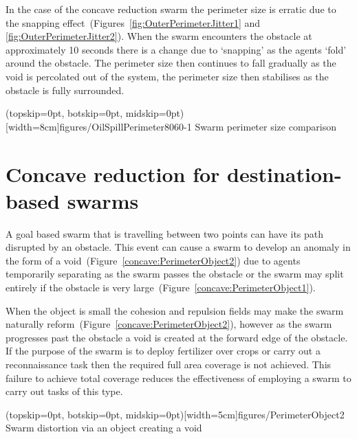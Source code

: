 \documentclass{ieeeaccess}
\begin{document}
In the case of the concave reduction swarm the perimeter size is erratic due to the snapping effect~(Figures~\ref{fig:OuterPerimeterJitter1} and \ref{fig:OuterPerimeterJitter2}). When the swarm encounters the obstacle at approximately 10 seconds there is a change due to `snapping' as the agents `fold' around the obstacle. The perimeter size then continues to fall gradually as the void is percolated out of the system, the perimeter size then stabilises as the obstacle is fully surrounded.

\Figure[t!](topskip=0pt, botskip=0pt, midskip=0pt)[width=8cm]{figures/OilSpillPerimeter8060-1}
{Swarm perimeter size comparison\label{concave:OilSpillPerimeter8060-1}}


\section{Concave reduction for destination-based swarms}\label{concave:mobileSwarm1}
A goal based swarm that is travelling between two points can have its path disrupted by an obstacle. This event can cause a swarm to develop an anomaly in the form of a void~(Figure~\ref{concave:PerimeterObject2}) due to agents temporarily separating as the swarm passes the obstacle or the swarm may split entirely if the obstacle is very large~(Figure~\ref{concave:PerimeterObject1}). 

When the object is small the cohesion and repulsion fields may make the swarm naturally reform~(Figure~\ref{concave:PerimeterObject2}), however as the swarm progresses past the obstacle a void is created at the forward edge of the obstacle. If the purpose of the swarm is to deploy fertilizer over crops or carry out a reconnaissance task then the required full area coverage is not achieved. This failure to achieve total coverage reduces the effectiveness of employing a swarm to carry out tasks of this type.

\Figure[t!](topskip=0pt, botskip=0pt, midskip=0pt)[width=5cm]{figures/PerimeterObject2}
{Swarm distortion via an object creating a void\label{concave:PerimeterObject2}}
\end{document}
